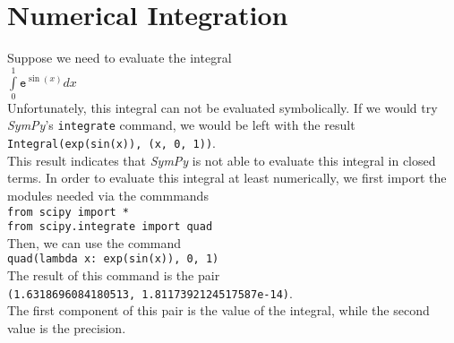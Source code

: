 \documentclass{report}
\begin{document}
\section{Numerical Integration}
Suppose we need to evaluate the integral
\\[0.2cm]
\hspace*{1.3cm}
$\displaystyle \int\limits_{0}^{1} \mathtt{e}^{\sin(x)} dx$
\\[0.2cm]
Unfortunately, this integral can not be evaluated symbolically.  If we would try \textsl{SymPy}'s
\texttt{integrate} command, we would be left with the result
\\[0.2cm]
\hspace*{1.3cm}
\texttt{Integral(exp(sin(x)), (x, 0, 1))}.
\\[0.2cm]
This result indicates that \textsl{SymPy} is not able to evaluate this integral in closed terms.
In order to evaluate this integral at least numerically, we first import the modules needed via the
commmands
\\[0.2cm]
\hspace*{1.3cm}
\texttt{from scipy import *} \\
\hspace*{1.3cm}
\texttt{from scipy.integrate import quad}
\\[0.2cm]
Then, we can use the command
\\[0.2cm]
\hspace*{1.3cm}
\texttt{quad(lambda x: exp(sin(x)), 0, 1)}
\\[0.2cm]
The result of this command is the pair
\\[0.2cm]
\hspace*{1.3cm}
\texttt{(1.6318696084180513, 1.8117392124517587e-14)}.
\\[0.2cm]
The first component of this pair is the value of the integral, while the second value is the
precision.
\end{document}

